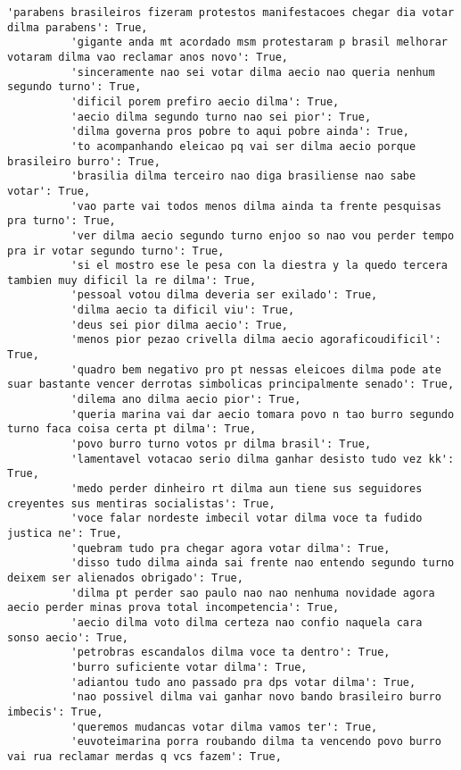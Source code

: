 \documentclass[11pt]{article}
\begin{document}
\begin{Verbatim}[commandchars=\\\{\}]
          'parabens brasileiros fizeram protestos manifestacoes chegar dia votar dilma parabens': True,
          'gigante anda mt acordado msm protestaram p brasil melhorar votaram dilma vao reclamar anos novo': True,
          'sinceramente nao sei votar dilma aecio nao queria nenhum segundo turno': True,
          'dificil porem prefiro aecio dilma': True,
          'aecio dilma segundo turno nao sei pior': True,
          'dilma governa pros pobre to aqui pobre ainda': True,
          'to acompanhando eleicao pq vai ser dilma aecio porque brasileiro burro': True,
          'brasilia dilma terceiro nao diga brasiliense nao sabe votar': True,
          'vao parte vai todos menos dilma ainda ta frente pesquisas pra turno': True,
          'ver dilma aecio segundo turno enjoo so nao vou perder tempo pra ir votar segundo turno': True,
          'si el mostro ese le pesa con la diestra y la quedo tercera tambien muy dificil la re dilma': True,
          'pessoal votou dilma deveria ser exilado': True,
          'dilma aecio ta dificil viu': True,
          'deus sei pior dilma aecio': True,
          'menos pior pezao crivella dilma aecio agoraficoudificil': True,
          'quadro bem negativo pro pt nessas eleicoes dilma pode ate suar bastante vencer derrotas simbolicas principalmente senado': True,
          'dilema ano dilma aecio pior': True,
          'queria marina vai dar aecio tomara povo n tao burro segundo turno faca coisa certa pt dilma': True,
          'povo burro turno votos pr dilma brasil': True,
          'lamentavel votacao serio dilma ganhar desisto tudo vez kk': True,
          'medo perder dinheiro rt dilma aun tiene sus seguidores creyentes sus mentiras socialistas': True,
          'voce falar nordeste imbecil votar dilma voce ta fudido justica ne': True,
          'quebram tudo pra chegar agora votar dilma': True,
          'disso tudo dilma ainda sai frente nao entendo segundo turno deixem ser alienados obrigado': True,
          'dilma pt perder sao paulo nao nao nenhuma novidade agora aecio perder minas prova total incompetencia': True,
          'aecio dilma voto dilma certeza nao confio naquela cara sonso aecio': True,
          'petrobras escandalos dilma voce ta dentro': True,
          'burro suficiente votar dilma': True,
          'adiantou tudo ano passado pra dps votar dilma': True,
          'nao possivel dilma vai ganhar novo bando brasileiro burro imbecis': True,
          'queremos mudancas votar dilma vamos ter': True,
          'euvoteimarina porra roubando dilma ta vencendo povo burro vai rua reclamar merdas q vcs fazem': True,

\end{Verbatim}
\end{document}
